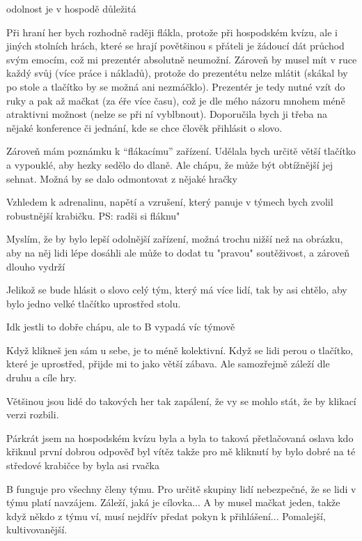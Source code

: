 \begtt
odolnost je v hospodě důležitá
\endtt

\begtt
Při hraní her bych rozhodně raději flákla, protože při
hospodském kvízu, ale i jiných stolních hrách, které se
hrají povětšinou s přáteli je žádoucí dát průchod svým emocím,
což mi prezentér absolutně neumožní. Zároveň by musel mít
v ruce každý svůj (více práce i nákladů), protože do prezentétu
nelze mlátit (skákal by po stole a tlačítko by se možná ani
nezmáčklo). Prezentér je tedy nutné vzít do ruky a pak až
mačkat (za éře více času), což je dle mého názoru mnohem
méně atraktivni možnost (nelze se při ní vyblbnout).
Doporučila bych ji třeba na nějaké konference či jednání,
kde se chce člověk přihlásit o slovo. 
\endtt

\begtt
Zároveň mám poznámku k “flákacímu” zařízení. Udělala bych určitě
větší tlačítko a vypouklé, aby hezky sedělo do dlaně. Ale chápu,
že může být obtížnější jej sehnat. Možná by se dalo odmontovat
z nějaké hračky
\endtt

\begtt
Vzhledem k adrenalinu, napětí a vzrušení, který panuje v týmech
bych zvolil robustnější krabičku.
PS: radši si fláknu"
\endtt

\begtt
Myslím, že by bylo lepší odolnější zařízení, možná trochu
nižší než na obrázku, aby na něj lidi lépe dosáhli ale může
to dodat tu "pravou" soutěživost, a zároveň dlouho vydrží
\endtt

\begtt
Jelikož se bude hlásit o slovo celý tým, který má více lidí,
tak by asi chtělo, aby bylo jedno velké tlačítko uprostřed stolu.
\endtt

\begtt
Idk jestli to dobře chápu, ale to B vypadá víc týmově
\endtt

\begtt
Když klikneš jen sám u sebe, je to méně kolektivní. Když
se lidi perou o tlačítko, které je uprostřed, přijde mi
to jako větší zábava. Ale samozřejmě záleží dle druhu
a cíle hry.
\endtt

\begtt
Většinou jsou lidé do takových her tak zapálení, že vy
se mohlo stát, že by klikací verzi rozbili.
\endtt

\begtt
Párkrát jsem na hospodském kvízu byla a byla to taková
přetlačovaná oslava kdo křiknul první dobrou odpověď byl
vítěz takže pro mě kliknutí by bylo dobré na té středové
krabičce by byla asi rvačka
\endtt

\begtt
B funguje pro všechny členy týmu. Pro určitě skupiny
lidí nebezpečné, že se lidi v týmu platí navzájem.
Záleží, jaká je cílovka...
A by musel mačkat jeden, takže když někdo z týmu ví,
musí nejdřív předat pokyn k přihlášení... Pomalejší,
kultivovanější.
\endtt

